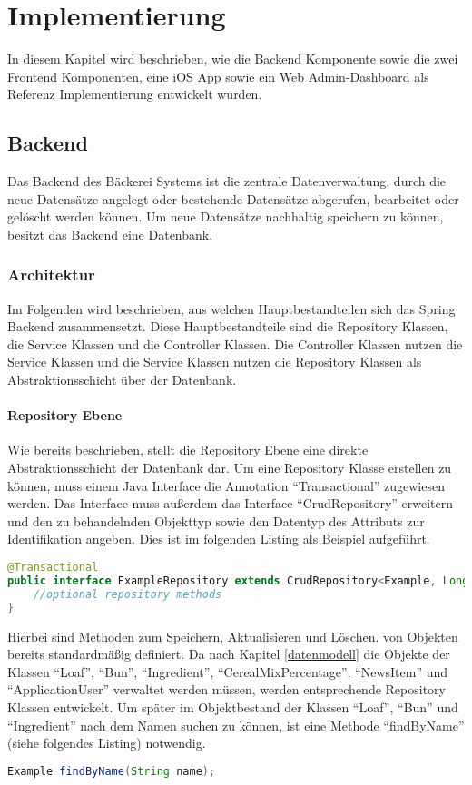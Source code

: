 \chapter{Implementierung}
In diesem Kapitel wird beschrieben, wie die Backend Komponente sowie die zwei Frontend Komponenten, eine iOS App sowie ein Web Admin-Dashboard als Referenz Implementierung entwickelt wurden. 

\section{Backend}
Das Backend des Bäckerei Systems ist die zentrale Datenverwaltung, durch die neue Datensätze angelegt oder bestehende Datensätze abgerufen, bearbeitet oder gelöscht werden können. Um neue Datensätze nachhaltig speichern zu können, besitzt das Backend eine Datenbank.

\clearpage

\subsection{Architektur}
Im Folgenden wird beschrieben, aus welchen Hauptbestandteilen sich das Spring Backend zusammensetzt.
Diese Hauptbestandteile sind die Repository Klassen, die Service Klassen und die Controller Klassen.
Die Controller Klassen nutzen die Service Klassen und die Service Klassen nutzen die Repository Klassen als Abstraktionsschicht über der Datenbank.

\subsubsection{Repository Ebene}
Wie bereits beschrieben, stellt die Repository Ebene eine direkte Abstraktionsschicht der Datenbank dar.
Um eine Repository Klasse erstellen zu können, muss einem Java Interface die Annotation \enquote{Transactional} zugewiesen werden. Das Interface muss außerdem das Interface \enquote {CrudRepository} erweitern und den zu behandelnden Objekttyp sowie den Datentyp des Attributs zur Identifikation angeben. Dies ist im folgenden Listing als Beispiel aufgeführt.
\begin{lstlisting}[language=Java]
@Transactional
public interface ExampleRepository extends CrudRepository<Example, Long> {
	//optional repository methods
}
\end{lstlisting}

Hierbei sind Methoden zum Speichern, Aktualisieren und Löschen. von Objekten bereits standardmäßig definiert.
Da nach Kapitel \ref{datenmodell} die Objekte der Klassen \enquote{Loaf}, \enquote{Bun}, \enquote{Ingredient}, \enquote{CerealMixPercentage}, \enquote{NewsItem} und \enquote{ApplicationUser} verwaltet werden müssen, werden entsprechende Repository Klassen entwickelt.
Um später im Objektbestand der Klassen \enquote{Loaf}, \enquote{Bun} und \enquote{Ingredient} nach dem Namen suchen zu können, ist eine Methode \enquote{findByName} (siehe folgendes Listing) notwendig.
\begin{lstlisting}[language=Java]
Example findByName(String name);
\end{lstlisting}


